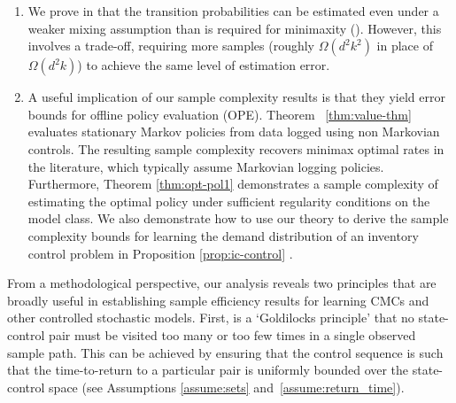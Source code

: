 \documentclass[opre,sglanonrev]{informs4}
\newcommand{\vinayak}[1]{\textcolor{red}{[Vinayak: #1]}}
\numberwithin{equation}{section}
\begin{document}
{\begin{enumerate}
\item %
We prove in  that the transition probabilities can be estimated even under a weaker mixing assumption than is required for minimaxity (). However, this involves a trade-off, requiring more samples (roughly $\Omega(d^2k^2)$ in place of $\Omega(d^2k)$) to achieve the same level of estimation error.%

\item A useful implication of our sample complexity results is that they yield error bounds for offline policy evaluation (OPE).
Theorem ~\ref{thm:value-thm} evaluates stationary Markov policies from data logged using non Markovian controls. 
The resulting sample complexity recovers minimax optimal rates in the literature, which typically assume Markovian logging policies. 
Furthermore, Theorem \ref{thm:opt-pol1} demonstrates a sample complexity of estimating the optimal policy under sufficient regularity conditions on the model class. We also demonstrate how to use our theory to derive the sample complexity bounds for learning the demand distribution of an inventory control problem in Proposition \ref{prop:ic-control} \citep{goldberg2021survey}.

\end{enumerate}

From a methodological perspective, our analysis reveals two principles that are broadly useful in establishing sample efficiency results for learning CMCs and other controlled stochastic models. First, is a `Goldilocks principle' that no state-control pair must be visited too many or too few times in a single observed sample path. This can be achieved by ensuring that the control sequence is such that the time-to-return to a particular pair is uniformly bounded over the state-control space (see Assumptions \ref{assume:sets} and~\ref{assume:return_time}). 

}
\end{document}
